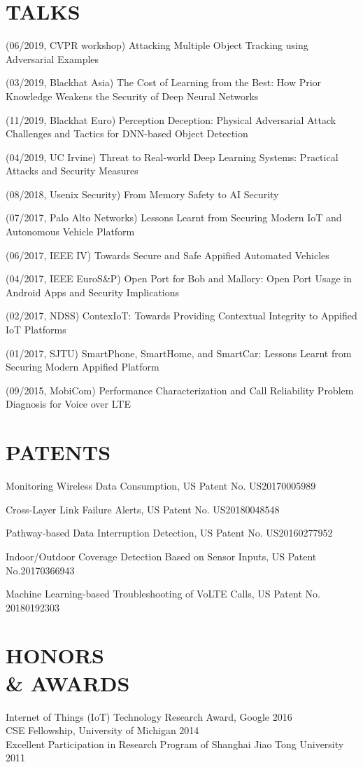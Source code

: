 \documentclass[margin]{res}
\begin{document}
\begin{resume}
\section{TALKS}

(06/2019, CVPR workshop) Attacking Multiple Object Tracking using Adversarial Examples

(03/2019, Blackhat Asia) The Cost of Learning from the Best: How Prior Knowledge Weakens the Security of Deep Neural Networks

(11/2019, Blackhat Euro) Perception Deception: Physical Adversarial Attack Challenges and Tactics for DNN-based Object Detection

(04/2019, UC Irvine) Threat to Real-world Deep Learning Systems: Practical Attacks and Security Measures

(08/2018, Usenix Security) From Memory Safety to AI Security

(07/2017, Palo Alto Networks) Lessons Learnt from Securing Modern IoT and Autonomous Vehicle Platform

(06/2017, IEEE IV) Towards Secure and Safe Appified Automated Vehicles

(04/2017, IEEE EuroS\&P) Open Port for Bob and Mallory: Open Port Usage in Android Apps and Security Implications

(02/2017, NDSS) ContexIoT: Towards Providing Contextual Integrity to Appified IoT Platforms

(01/2017, SJTU) SmartPhone, SmartHome, and SmartCar: Lessons Learnt from Securing Modern Appified Platform

(09/2015, MobiCom) Performance Characterization and Call Reliability Problem Diagnosis for Voice over LTE

\section{PATENTS}

Monitoring Wireless Data Consumption, US Patent No. US20170005989

Cross-Layer Link Failure Alerts, US Patent No. US20180048548

Pathway-based Data Interruption Detection, US Patent No. US20160277952

Indoor/Outdoor Coverage Detection Based on Sensor Inputs, US Patent No.20170366943

Machine Learning-based Troubleshooting of VoLTE Calls, US Patent No. 20180192303


\section{HONORS\\ \& AWARDS}
Internet of Things (IoT) Technology Research Award, Google \hfill 2016\\
CSE Fellowship, University of Michigan \hfill 2014 \\
Excellent Participation in Research Program of Shanghai Jiao Tong University \hfill 2011 \\


\end{resume}
\end{document}
